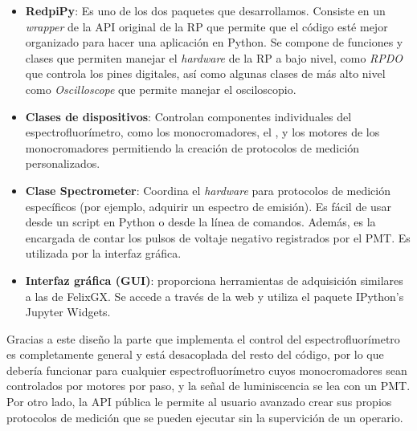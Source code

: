 \begin{itemize}
     \item \textbf{RedpiPy}: Es uno de los dos paquetes que desarrollamos. Consiste en un \textit{wrapper} de la API original de la RP que permite que el código esté mejor organizado para hacer una aplicación en Python. Se compone de funciones y clases que permiten manejar el \textit{hardware} de la RP a bajo nivel, como \textit{RPDO} que controla los pines digitales, así como algunas clases de más alto nivel como \textit{Oscilloscope} que permite manejar el osciloscopio.
     \item \textbf{Clases de dispositivos}: Controlan componentes individuales del espectrofluorímetro, como los monocromadores, el , y los motores de los monocromadores permitiendo la creación de protocolos de medición personalizados. 
     \item \textbf{Clase Spectrometer}: Coordina el \textit{hardware} para protocolos de medición específicos (por ejemplo, adquirir un espectro de emisión). Es fácil de usar desde un script en Python o desde la línea de comandos. Además, es la encargada de contar los pulsos de voltaje negativo registrados por el PMT. Es utilizada por la interfaz gráfica.
     \item \textbf{Interfaz gráfica (GUI)}: proporciona herramientas de adquisición similares a las de FelixGX. Se accede a través de la web y utiliza el paquete IPython's Jupyter Widgets.
\end{itemize}

Gracias a este diseño la parte que implementa el control del espectrofluorímetro es completamente general y está desacoplada del resto del código, por lo que debería funcionar para cualquier espectrofluorímetro cuyos monocromadores sean controlados por motores por paso, y la señal de luminiscencia se lea con un PMT.
Por otro lado, la API pública le permite al usuario avanzado crear sus propios protocolos de medición que se pueden ejecutar sin la supervición de un operario.



